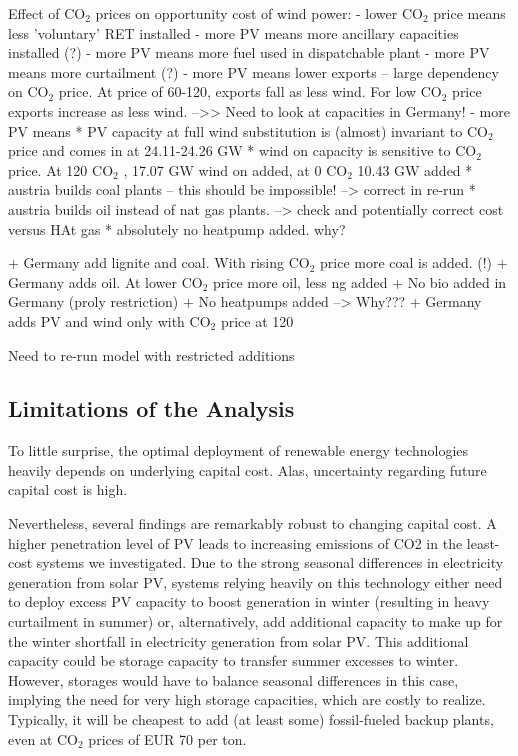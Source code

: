 \documentclass[final, 3p, times]{elsarticle} %
\newcommand{\COO}{\ensuremath{\mathrm{CO_2}} }
\begin{document}
    Effect of \COO prices on opportunity cost of wind power:
    - lower \COO price means less 'voluntary' RET installed
    - more PV means more ancillary capacities installed (?)
    - more PV means more fuel used in dispatchable plant
    - more PV means more curtailment (?)
    - more PV means lower exports -- large dependency on \COO price. At price of 60-120, exports fall as less wind.
    For low \COO price exports increase as less wind. -->> Need to look at capacities in Germany!
    - more PV means
    * PV capacity at full wind substitution is (almost) invariant to \COO price and comes in at 24.11-24.26 GW
    * wind on capacity is sensitive to \COO price. At 120 \EUR \COO, 17.07 GW wind on added, at 0 \EUR \COO10.43 GW added
    * austria builds coal plants -- this should be impossible! --> correct in re-run
    * austria builds oil instead of nat gas plants. --> check and potentially correct cost versus HAt gas
    * absolutely no heatpump added. why?

    + Germany add lignite and coal. With rising \COO price more coal is added. (!)
    + Germany adds oil. At lower \COO price more oil, less ng added
    + No bio added in Germany (proly restriction)
    + No heatpumps added --> Why???
    + Germany adds PV and wind only with \COO price at 120

    Need to re-run model with restricted additions

    \subsection{Limitations of the Analysis}
    To little surprise, the optimal deployment of renewable energy technologies heavily depends on underlying capital
    cost.
    Alas, uncertainty regarding future capital cost is high.

    Nevertheless, several findings are remarkably robust to changing capital cost.
    A higher penetration level of PV leads to increasing emissions of CO2 in the least-cost systems we investigated.
    Due to the strong seasonal differences in electricity generation from solar PV, systems relying heavily on this technology either need to deploy excess PV capacity to boost generation in winter (resulting in heavy curtailment in summer) or, alternatively, add additional capacity to make up for the winter shortfall in electricity generation from solar PV.
    This additional capacity could be storage capacity to transfer summer excesses to winter.
    However, storages would have to balance seasonal differences in this case, implying the need for very high storage capacities, which are costly to realize.
    Typically, it will be cheapest to add (at least some) fossil-fueled backup plants, even at \COO prices of EUR 70 per ton.
\end{document}
